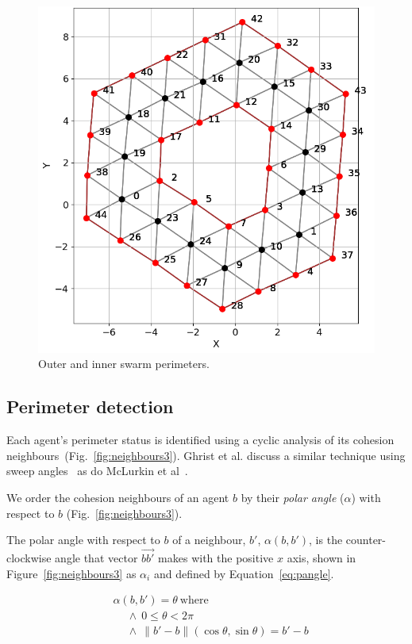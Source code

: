 \documentclass[12pt,a4paper]{IEEEtran}
\newcommand{\pangle}{\mathit{\alpha}}
\begin{document}
\begin{figure}[H]
	\begin{center}
		\includegraphics[width=0.8\linewidth]{figures/relationships2}
	\end{center}
	\caption{Outer and inner swarm perimeters. \label{fig:simplePerim2}}
\end{figure}

\subsection{Perimeter detection}\label{sec:perimeterDetection} 

Each agent's perimeter status is identified using a cyclic analysis of its cohesion neighbours~(Fig.~\ref{fig:neighbours3}). Ghrist et al. discuss a similar technique using sweep angles~\cite{ghrist2008surrounding} as do McLurkin et al~\cite{mclurkin2009}. 

We order the cohesion neighbours of an agent $b$ by their \emph{polar angle} ($\alpha$) with respect to $b$ (Fig.~\ref{fig:neighbours3}). 

The polar angle with respect to $b$ of a neighbour, $b'$, $\pangle(b, b')$, is the counter-clockwise angle that vector $\vec{bb'}$ makes with the positive $x$ axis, shown in Figure~\ref{fig:neighbours3} as $\alpha_i$ and defined by Equation~\ref{eq:pangle}.

\begin{align}\label{eq:pangle}
	& \pangle(b, b') = \theta~\mathrm{where}   \nonumber \\
	&		\quad~\land~0 \leq \theta < 2\pi \nonumber \\
	&   \quad~\land~\|b'-b\|(\cos\theta,\sin\theta) = b'- b 
\end{align} 
\end{document}
